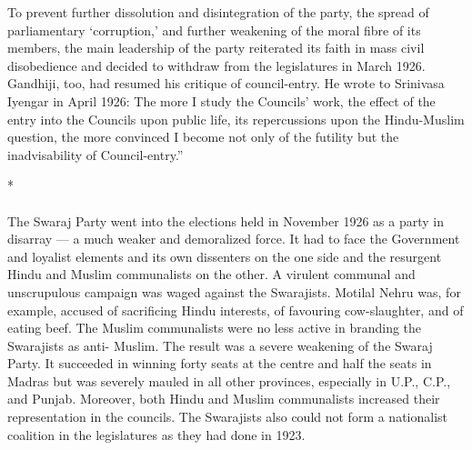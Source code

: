 \begin{multicols}{2}
To prevent further dissolution and disintegration of the party, the spread of parliamentary `corruption,' and further weakening of the moral fibre of its members, the main leadership of the party reiterated its faith in mass civil disobedience and decided to withdraw from the legislatures in March 1926. Gandhiji, too, had resumed his critique of council-entry. He wrote to Srinivasa Iyengar in April 1926: The more I study the Councils' work, the effect of the entry into the Councils upon public life, its repercussions upon the Hindu-Muslim question, the more convinced I become not only of the futility but the inadvisability of Council-entry.''

\begin{center}*\end{center}

\paragraph*{}
The Swaraj Party went into the elections held in November 1926 as a party in disarray --- a much weaker and demoralized force. It had to face the Government and loyalist elements and its own dissenters on the one side and the resurgent Hindu and Muslim communalists on the other. A virulent communal and unscrupulous campaign was waged against the Swarajists. Motilal Nehru was, for example, accused of sacrificing Hindu interests, of favouring cow-slaughter, and of eating beef. The Muslim communalists were no less active in branding the Swarajists as anti- Muslim. The result was a severe weakening of the Swaraj Party. It succeeded in winning forty seats at the centre and half the seats in Madras but was severely mauled in all other provinces, especially in U.P., C.P., and Punjab. Moreover, both Hindu and Muslim communalists increased their representation in the councils. The Swarajists also could not form a nationalist coalition in the legislatures as they had done in 1923.


\end{multicols}
